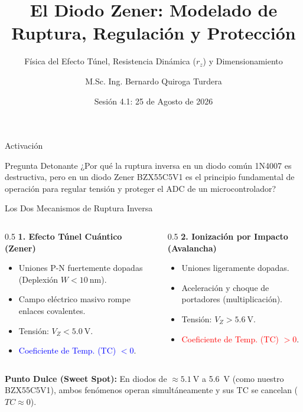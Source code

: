\documentclass[10pt, aspectratio=169]{beamer}
\title[Diodos Zener y Regulación]{El Diodo Zener: Modelado de Ruptura, Regulación y Protección}
\subtitle{Física del Efecto Túnel, Resistencia Dinámica ($r_z$) y Dimensionamiento}
\author{M.Sc. Ing. Bernardo Quiroga Turdera}
\institute[UCB Tarija]{Circuitos Electrónicos III (IMT-221)}
\date{Sesión 4.1: 25 de Agosto de 2026}
\begin{document}
\begin{frame}
  \titlepage
\end{frame}

\begin{frame}{Activación}
  \begin{block}{Pregunta Detonante}
      ¿Por qué la ruptura inversa en un diodo común 1N4007 es destructiva, pero en un diodo Zener BZX55C5V1 es el principio fundamental de operación para regular tensión y proteger el ADC de un microcontrolador?
  \end{block}
\end{frame}

\begin{frame}{Los Dos Mecanismos de Ruptura Inversa}
  \begin{columns}
      \begin{column}{0.5\textwidth}
          \textbf{1. Efecto Túnel Cuántico (Zener)}
          \begin{itemize}
              \item Uniones P-N fuertemente dopadas (Deplexión $W < \qty{10}{\nano\meter}$).
              \item Campo eléctrico masivo rompe enlaces covalentes.
              \item Tensión: $V_Z < \qty{5.0}{\volt}$.
              \item \textcolor{blue}{Coeficiente de Temp. (TC) $< 0$}.
          \end{itemize}
      \end{column}
      \begin{column}{0.5\textwidth}
          \textbf{2. Ionización por Impacto (Avalancha)}
          \begin{itemize}
              \item Uniones ligeramente dopadas.
              \item Aceleración y choque de portadores (multiplicación).
              \item Tensión: $V_Z > \qty{5.6}{\volt}$.
              \item \textcolor{red}{Coeficiente de Temp. (TC) $> 0$}.
          \end{itemize}
      \end{column}
  \end{columns}
  
  \vspace{0.4cm}
  \alert{\textbf{Punto Dulce (Sweet Spot):}} En diodos de $\approx \qty{5.1}{\volt}$ a \qty{5.6}{\volt} (como nuestro BZX55C5V1), ambos fenómenos operan simultáneamente y sus TC se cancelan ($TC \approx 0$).
\end{frame}
\end{document}
